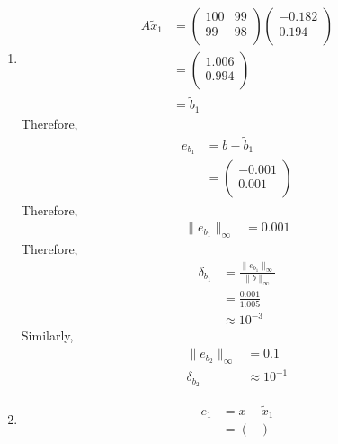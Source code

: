 \documentclass[fleqn, a4paper, 12pt, twoside]{article}
\theoremstyle{definition}
\theoremstyle{theorem}
\renewcommand{\tilde}{\widetilde}
\begin{document}
\begin{solution}
	\begin{enumerate}[leftmargin=*]
		\item
			\begin{align*}
				A \tilde{x}_1 &=
					\begin{pmatrix}
						100 & 99 \\
						99  & 98 \\
					\end{pmatrix}
					\begin{pmatrix}
						-0.182 \\
						0.194  \\
					\end{pmatrix}\\
				&=
					\begin{pmatrix}
						1.006 \\
						0.994 \\
					\end{pmatrix}\\
				&= \tilde{b}_1
			\end{align*}
			Therefore,
			\begin{align*}
				e_{b_1} &= b - \tilde{b}_1\\
				&=
					\begin{pmatrix}
						-0.001 \\
						0.001  \\
					\end{pmatrix}
			\end{align*}
			Therefore,
			\begin{align*}
				\|e_{b_1}\|_{\infty} & = 0.001
			\end{align*}
			Therefore,
			\begin{align*}
				\delta_{b_1} & = \frac{\|e_{b_1}\|_{\infty}}{\|b\|_{\infty}} \\
                                             & = \frac{0.001}{1.005}                         \\
                                             & \approx 10^{-3}
			\end{align*}
			Similarly,
			\begin{align*}
				\|e_{b_2}\|_{\infty} & = 0.1 \\
				\delta_{b_2}         & \approx 10^{-1}
			\end{align*}
		\item
			\begin{align*}
				e_1 &= x - \tilde{x}_1\\
				&=
					\begin{pmatrix}

\end{pmatrix}
\end{align*}
\end{enumerate}
\end{solution}
\end{document}

